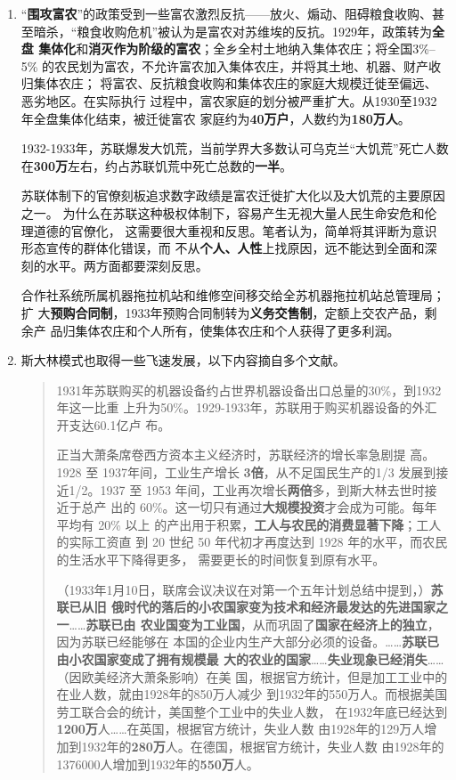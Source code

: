 \begin{enumerate}

\item “\textbf{围攻富农}”的政策受到一些富农激烈反抗——放火、煽动、阻碍粮食收购、甚
  至暗杀，“粮食收购危机”被认为是富农对苏维埃的反抗。1929年，政策转为\textbf{全盘
    集体化}和\textbf{消灭作为阶级的富农}；全乡全村土地纳入集体农庄；将全国3\%--5\%
  的农民划为富农，不允许富农加入集体农庄，并将其土地、机器、财产收归集体农庄；
  将富农、反抗粮食收购和集体农庄的家庭大规模迁徙至偏远、恶劣地区。在实际执行
  过程中，富农家庭的划分被严重扩大。从1930至1932年全盘集体化结束，被迁徙富农
  家庭约为\textbf{40万户}，人数约为\textbf{180万人}。\cite{xulongbinsu}

  1932-1933年，苏联爆发大饥荒，当前学界大多数认可乌克兰“大饥荒”死亡人数
  在\textbf{300万}左右，约占苏联饥荒中死亡总数的\textbf{一半}。\cite{wukelanjihuang}

  苏联体制下的官僚刻板追求数字政绩是富农迁徙扩大化以及大饥荒的主要原因之一。
  为什么在苏联这种极权体制下，容易产生无视大量人民生命安危和伦理道德的官僚化，
  这需要很大重视和反思。笔者认为，简单将其评断为意识形态宣传的群体化错误，而
  不从\textbf{个人、人性}上找原因，远不能达到全面和深刻的水平。两方面都要深刻反思。

  合作社系统所属机器拖拉机站和维修空间移交给全苏机器拖拉机站总管理局；扩
  大\textbf{预购合同制}，1933年预购合同制转为\textbf{义务交售制}，定额上交农产品，剩余产
  品归集体农庄和个人所有，使集体农庄和个人获得了更多利润。

\item 斯大林模式也取得一些飞速发展，以下内容摘自多个文献。

  \begin{quotation}
    1931年苏联购买的机器设备约占世界机器设备出口总量的30\%，到1932年这一比重
    上升为50\%。1929-1933年，苏联用于购买机器设备的外汇开支达60.1亿卢
    布。\cite[277]{bigrussia}

    正当大萧条席卷西方资本主义经济时，苏联经济的增长率急剧提
    高。 1928 至 1937年间，工业生产增长 \textbf{3倍}，从不足国民生产的1/3 发展到接
    近1/2。1937 至 1953 年间，工业再次增长\textbf{两倍}多，到斯大林去世时接近于总产
    出的 60\%。这一切只有通过\textbf{大规模投资}才会成为可能。每年平均有 20\% 以上
    的产出用于积累，\textbf{工人与农民的消费显著下降}；工人的实际工资直
    到 20 世纪 50 年代初才再度达到 1928 年的水平，而农民的生活水平下降得更多，
    需要更长的时间恢复到原有水平。\cite[31]{mazhengshi2}

    （1933年1月10日，联席会议决议在对第一个五年计划总结中提到，）\textbf{苏联已从旧
      俄时代的落后的小农国家变为技术和经济最发达的先进国家之一}……\textbf{苏联已由
      农业国变为工业国}，从而巩固了\textbf{国家在经济上的独立}，因为苏联已经能够在
    本国的企业内生产大部分必须的设备。……\textbf{苏联已由小农国家变成了拥有规模最
      大的农业的国家}……\textbf{失业现象已经消失}……（因欧美经济大萧条影响）在美
    国，根据官方统计，但是加工工业中的在业人数，就由1928年的850万人减少
    到1932年的550万人。而根据美国劳工联合会的统计，美国整个工业中的失业人数，
    在1932年底已经达到\textbf{1200万}人……在英国，根据官方统计，失业人数
    由1928年的129万人增加到1932年的\textbf{280万}人。在德国，根据官方统计，失业人数
    由1928年的1376000人增加到1932年的\textbf{550万}人。\cite[321-329]{jueyi4}


\end{quotation}
\end{enumerate}
